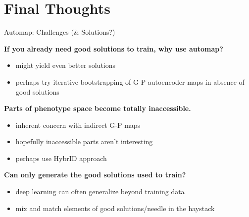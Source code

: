 \section{Final Thoughts}

\begin{frame}{Automap: Challenges (\& Solutions?)}

\textbf{If you already need good solutions to train, why use automap?}
\pause
\vspace{-1ex}
\begin{itemize}[<+->]
\itemsep0em
\item might yield even better solutions
\item perhaps try iterative bootstrapping of G-P autoencoder maps in absence of good solutions
\end{itemize}
\vspace{-1ex}
\pause
\textbf{Parts of phenotype space become totally inaccessible.}
\pause
\vspace{-1ex}
\begin{itemize}[<+->]
\itemsep0em
\item inherent concern with indirect G-P maps \cite{clune2008generative}
\item hopefully inaccessible parts aren't interesting
\item perhaps use HybrID approach \cite{clune2009hybrid}
\end{itemize}
\vspace{-1ex}
\pause
\textbf{Can only generate the good solutions used to train?}
\pause
\vspace{-1ex}
\begin{itemize}[<+->]
\itemsep0em
\item deep learning can often generalize beyond training data
\item mix and match elements of good solutions/needle in the haystack
\end{itemize}

\end{frame}
